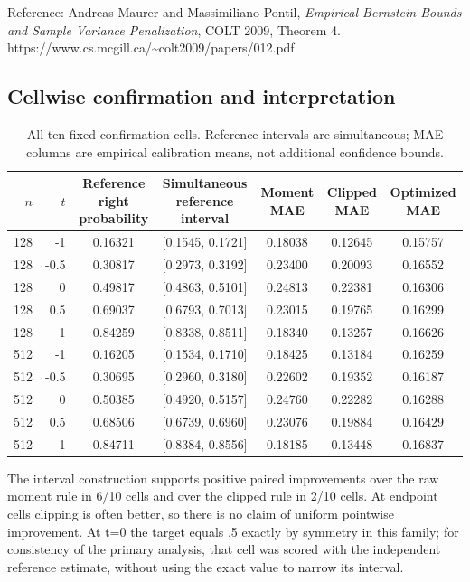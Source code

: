 Reference: Andreas Maurer and Massimiliano Pontil, \emph{Empirical Bernstein Bounds and Sample Variance Penalization}, COLT 2009, Theorem 4. https://www.cs.mcgill.ca/\textasciitilde colt2009/papers/012.pdf

\subsection{Cellwise confirmation and interpretation}\label{cellwise-confirmation-and-interpretation}

{\def\LTcaptype{none} %
\begin{table}[t]
\centering\small
\begin{tabular}{rrccccc}
\toprule
$n$ & $t$ & Reference right probability & Simultaneous reference interval & Moment MAE & Clipped MAE & Optimized MAE \\
\midrule
128 & -1 & 0.16321 & [0.1545, 0.1721] & 0.18038 & 0.12645 & 0.15757 \\
128 & -0.5 & 0.30817 & [0.2973, 0.3192] & 0.23400 & 0.20093 & 0.16552 \\
128 & 0 & 0.49817 & [0.4863, 0.5101] & 0.24813 & 0.22381 & 0.16306 \\
128 & 0.5 & 0.69037 & [0.6793, 0.7013] & 0.23015 & 0.19765 & 0.16299 \\
128 & 1 & 0.84259 & [0.8338, 0.8511] & 0.18340 & 0.13257 & 0.16626 \\
512 & -1 & 0.16205 & [0.1534, 0.1710] & 0.18425 & 0.13184 & 0.16259 \\
512 & -0.5 & 0.30695 & [0.2960, 0.3180] & 0.22602 & 0.19352 & 0.16187 \\
512 & 0 & 0.50385 & [0.4920, 0.5157] & 0.24760 & 0.22282 & 0.16288 \\
512 & 0.5 & 0.68506 & [0.6739, 0.6960] & 0.23076 & 0.19884 & 0.16429 \\
512 & 1 & 0.84711 & [0.8384, 0.8556] & 0.18185 & 0.13448 & 0.16837 \\
\bottomrule
\end{tabular}
\caption{All ten fixed confirmation cells. Reference intervals are simultaneous; MAE columns are empirical calibration means, not additional confidence bounds.}\label{tab:cells}
\end{table}
}

The interval construction supports positive paired improvements over the raw moment rule in 6/10 cells and over the clipped rule in 2/10 cells. At endpoint cells clipping is often better, so there is no claim of uniform pointwise improvement. At t=0 the target equals .5 exactly by symmetry in this family; for consistency of the primary analysis, that cell was scored with the independent reference estimate, without using the exact value to narrow its interval.

